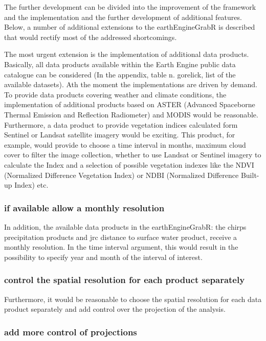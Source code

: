 \documentclass[12pt,twoside,a4paper,final]{report}
\begin{document}
The further development can be divided into the improvement of the framework and the implementation and the further development of additional features.
Below, a number of additional extensions to the earthEngineGrabR is described that would rectify most of the addressed shortcomings.


The most urgent extension is the implementation of additional data products. Basically, all data products available within the Earth Engine public data catalogue can be considered (In the appendix, table n. gorelick, list of the available datasets). Ath the moment the implementations are driven by demand. To provide data products covering weather and climate conditions, the implementation of additional products based on ASTER (Advanced Spaceborne Thermal Emission and Reflection Radiometer) and MODIS would be reasonable. Furthermore, a data product to provide vegetation indices calculated form Sentinel or Landsat satellite imagery would be exciting. This product, for example, would provide to choose a time interval in months, maximum cloud cover to filter the image collection, whether to use Landsat or Sentinel imagery to calculate the Index and a selection of possible vegetation indexes like the NDVI (Normalized Difference Vegetation Index) or NDBI (Normalized Difference Built-up Index) etc. 

\subsubsection{if available allow a monthly resolution}
 

In addition, the available data products in the earthEngineGrabR: the chirps precipitation products and jrc distance to surface water product, receive a monthly resolution. In the time interval argument, this would result in the possibility to specify year and month of the interval of interest.

\subsubsection{control the spatial resolution for each product separately}
 



Furthermore, it would be reasonable to choose the spatial resolution for each data product separately and add control over the projection of the analysis. 


\subsubsection{add more control of projections}
 
\end{document}
